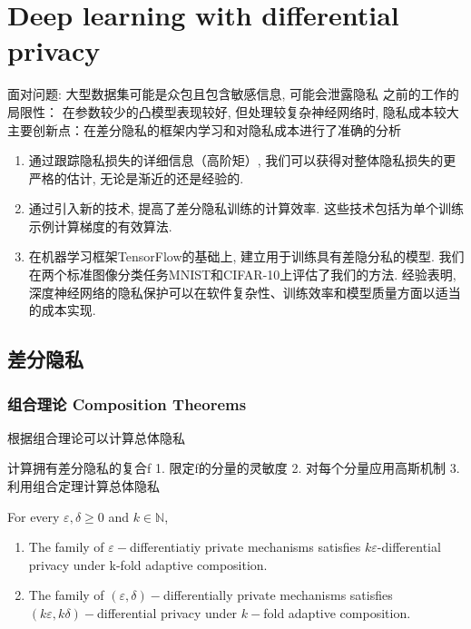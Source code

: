 \section{Deep learning with differential privacy}

面对问题: 大型数据集可能是众包且包含敏感信息, 可能会泄露隐私
之前的工作的局限性： 在参数较少的凸模型表现较好, 但处理较复杂神经网络时, 隐私成本较大
主要创新点：在差分隐私的框架内学习和对隐私成本进行了准确的分析

\begin{enumerate}
    \item 
通过跟踪隐私损失的详细信息（高阶矩）, 我们可以获得对整体隐私损失的更严格的估计, 无论是渐近的还是经验的. 
\item 
通过引入新的技术, 提高了差分隐私训练的计算效率. 这些技术包括为单个训练示例计算梯度的有效算法. 
\item 
在机器学习框架TensorFlow的基础上, 建立用于训练具有差隐分私的模型. 我们在两个标准图像分类任务MNIST和CIFAR-10上评估了我们的方法. 经验表明, 深度神经网络的隐私保护可以在软件复杂性、训练效率和模型质量方面以适当的成本实现. 
\end{enumerate}
 

\subsection{差分隐私}

\subsubsection{组合理论 Composition Theorems} 

根据组合理论\cite{Dwork2010boosting}可以计算总体隐私 

计算拥有差分隐私的复合f
1. 限定f的分量的灵敏度
2. 对每个分量应用高斯机制
3.利用组合定理计算总体隐私 
 


\begin{theorem}

For every $\varepsilon, \delta\geq 0$ and $k\in \mathbb{N}$,

\begin{enumerate}
    \item The family of $\varepsilon-$differentiatiy private mechanisms satisfies $k\varepsilon$-differential privacy under k-fold adaptive composition.

    \item  The family of  $(\varepsilon, \delta)-$differentially private mechanisms satisfies $(k \varepsilon, k \delta)-$differential privacy under $k-$fold adaptive composition.
\end{enumerate}


\end{theorem}

